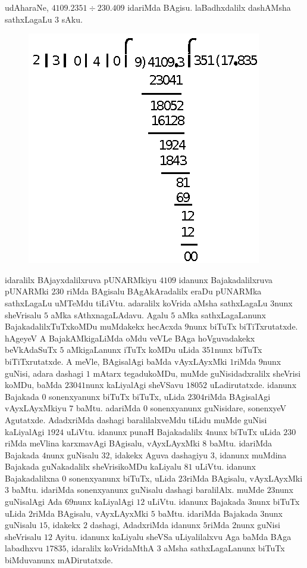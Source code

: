 udAharaNe, $4109.2351\div 230.409$ idariMda BAgisu. laBadhxdalilx dashAMsha sathxLagaLu $3$ sAku.\\

\begin{figure}[H]
\centering
\includegraphics[scale=1.5]{5.eps}
\end{figure}

idaralilx BAjayxdalilxruva pUNARMkiyu $4109$ idanunx Bajakadalilxruva pUNARMki $230$ riMda BAgi\-salu BAgAkAradalilx eraDu pUNARMka sathxLagaLu uMTeMdu tiLiVtu. adaralilx koVrida aMsha sathxLagaLu $3$nunx sheVrisalu $5$ aMka  sAthxnagaLAdavu. Agalu $5$ aMka sathxLagaLanunx BajakadalilxTuTxkoMDu muMdakekx hecAcxda $9$nunx biTuTx biTiTxrutatxde. hAgeyeV A BajakAMkigaLiMda oMdu veVLe BAga hoVguvadakekx beVkAdaSuTx $5$ aMkigaLanunx iTuTx koMDu uLida $351$nunx biTuTx biTiTxrutatxde. A meVle, BAgisalAgi baMda vAyxLAyxMki $1$riMda $9$nunx guNisi, adara dashagi $1$ mAtarx tegadukoMDu, muMde guNisidadxralilx sheVrisi koMDu, baMda $23041$nunx kaLiyalAgi sheVSavu $18052$ uLadirutatxde. idanunx Bajakada $0$ sonenxyanunx biTuTx biTuTx, uLida $2304$riMda BAgisalAgi vAyxLAyxMkiyu $7$ baMtu. adariMda $0$ sonenxyanunx guNisidare, sonenxyeV Agutatxde. AdadxriMda dashagi bara\-lilalxveMdu tiLidu muMde guNisi kaLiyalAgi $1924$ uLiVtu. idanunx punaH Bajakadalilx $4$nunx biTuTx uLida $230$riMda meVlina karxmavAgi BAgisalu, vAyxLAyxMki $8$ baMtu. idariMda Bajakada $4$nunx guNisalu $32$, idakekx Aguva dashagiyu $3$, idanunx muMdina Bajakada guNakadalilx sheVrisikoMDu kaLiyalu $81$ uLiVtu. idanunx Bajakadalilxna $0$ sonenxyanunx biTuTx, uLida $23$riMda BAgi\-salu, vAyxLAyxMki $3$ baMtu. idariMda sonenxyanunx guNisalu dashagi baralilAlx. muMde $23$nunx guNisalAgi Ada $69$nunx kaLiyalAgi $12$ uLiVtu. idanunx Bajakada $3$nunx biTuTx uLida $2$riMda BAgisalu, vAyxLAyxMki $5$ baMtu. idariMda Bajakada $3$nunx guNisalu $15$, idakekx $2$ dashagi, AdadxriMda idanunx $5$riMda $2$nunx guNisi sheVrisalu $12$ Ayitu. idanunx kaLiyalu sheVSa uLiyalilalxvu Aga baMda BAga labadhxvu $17835$, idaralilx koVridaMthA $3$ aMsha sathxLagaLanunx biTuTx biMduvanunx mADirutatxde.\\

